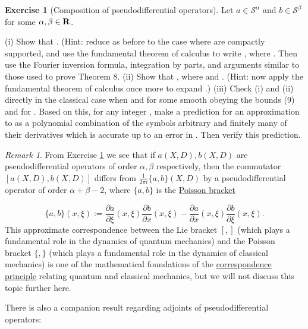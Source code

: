 \documentclass[11pt]{article}
\theoremstyle{definition}
\newtheorem{exercise}[theorem]{Exercise}
\theoremstyle{remark}
\newtheorem{remark}[theorem]{Remark}
\begin{document}
\begin{exercise}[Composition of pseudodifferential operators]
 \label{comp-p} Let \({a \in {\mathcal S}^\alpha}\) and \({b \in {\mathcal S}^\beta}\) for some \({\alpha,\beta \in {\bf R}}\). 


(i) Show that . (Hint: reduce as before to the case where  are compactly supported, and use the fundamental theorem of calculus to write , where . Then use the Fourier inversion formula, integration by parts, and arguments similar to those used to prove Theorem 8. 
(ii) Show that , where  and . (Hint: now apply the fundamental theorem of calculus once more to expand .) 
(iii) Check (i) and (ii) directly in the classical case when  and  for some smooth  obeying the bounds (9) and for . Based on this, for any integer , make a prediction for an approximation to  as a polynomial combination of the symbols arbitrary  and finitely many of their derivatives which is accurate up to an error in . Then verify this prediction.



\end{exercise}
\begin{remark}
 \label{ph} From Exercise \ref{comp-p} we see that if \({a(X,D), b(X,D)}\) are pseudodifferential operators of order \({\alpha,\beta}\) respectively, then the commutator \({[a(X,D),b(X,D)]}\) differs from \({\frac{1}{2\pi i} \{a,b\}(X,D)}\) by a pseudodifferential operator of order \({\alpha+\beta-2}\), where \({\{a,b\}}\) is the \href{https://en.wikipedia.org/wiki/Poisson_bracket}{Poisson bracket} 

\[\displaystyle  \{a,b\}(x,\xi) := \frac{\partial a}{\partial \xi}(x,\xi) \frac{\partial b}{\partial x}(x,\xi) - \frac{\partial a}{\partial x}(x,\xi) \frac{\partial b}{\partial \xi}(x,\xi).\]
 This approximate correspondence between the Lie bracket \({[,]}\) (which plays a fundamental role in the dynamics of quantum mechanics) and the Poisson bracket \({\{,\}}\) (which plays a fundamental role in the dynamics of classical mechanics) is one of the mathematical foundations of the \href{https://en.wikipedia.org/wiki/Correspondence_principle}{correspondence principle} relating quantum and classical mechanics, but we will not discuss this topic further here. 

\end{remark}

There is also a companion result regarding adjoints of pseudodifferential operators:
\end{document}

